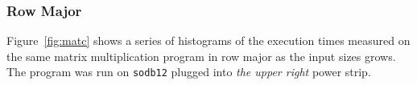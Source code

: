 \documentclass[10pt]{article}
\begin{document}
\clearpage
\pagebreak

\subsubsection{Row Major}

Figure~\ref{fig:matc} shows a series of 
histograms of the execution times measured on 
the same matrix multiplication program in row major as the input sizes grows. 
The program was run on {\tt sodb12} plugged into {\em the upper right} power strip.


%
\end{document}
